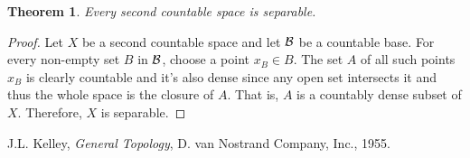 \documentclass[12pt]{article}
\newtheorem{thm}{Theorem}
\begin{document}
\begin{thm} \cite{kelley}
  Every second countable space is separable.
\end{thm}


\begin{proof}
Let $X$ be a second countable space and let $\cal B$ be a countable base.
For every non-empty set $B$ in $\cal B$, choose a point $x_B\in B$. The set $A$ 
of all such points $x_B$ is clearly countable and it's also dense 
since any open set intersects it and thus the whole space is the closure of $A$.
That is, $A$ is a countably dense subset of $X$. Therefore, $X$ is separable.
\end{proof}

\begin{thebibliography}{9}
J.L. Kelley, \emph{General Topology}, D. van Nostrand Company, Inc., 1955.
\end{thebibliography}
\end{document}
